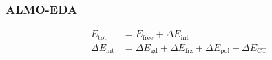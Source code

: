 \documentclass{beamer}
\begin{document}
\begin{frame}
  \frametitle{ALMO-EDA}
  \centering
  \begin{equation*}
    \begin{aligned}
      E_{\text{tot}} &= E_{\text{free}} + \Delta E_{\text{int}} \\
      \Delta E_{\text{int}} &= \Delta E_{\text{gd}} + \Delta E_{\text{frz}} + \Delta E_{\text{pol}} + \Delta E_{\text{CT}}
    \end{aligned}
  \end{equation*}

\end{frame}
\end{document}
